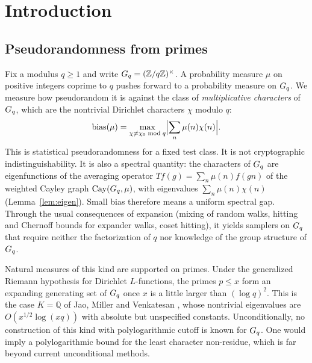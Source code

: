 \section{Introduction}\label{sec:intro}

\subsection{Pseudorandomness from primes}
Fix a modulus $q\ge 1$ and write $G_q=(\mathbb{Z}/q\mathbb{Z})^\times$. A probability measure $\mu$ on positive
integers coprime to $q$ pushes forward to a probability measure on $G_q$. We measure how
pseudorandom it is against the class of \emph{multiplicative characters} of $G_q$, which are the
nontrivial Dirichlet characters $\chi$ modulo $q$:
\[
  \operatorname{bias}(\mu)=\max_{\chi\ne\chi_0 \bmod q}\Bigl\lvert\sum_n \mu(n)\chi(n)\Bigr\rvert .
\]
This is statistical pseudorandomness for a fixed test class. It is not cryptographic
indistinguishability. It is also a spectral quantity: the characters of $G_q$ are eigenfunctions of the
averaging operator $Tf(g)=\sum_n\mu(n)f(gn)$ of the weighted Cayley graph $\mathrm{Cay}(G_q,\mu)$, with
eigenvalues $\sum_n\mu(n)\chi(n)$ (Lemma~\ref{lem:eigen}). Small bias therefore means a uniform
spectral gap. Through the usual consequences of expansion (mixing of random walks, hitting and
Chernoff bounds for expander walks, coset hitting), it yields samplers on $G_q$ that require
neither the factorization of $q$ nor knowledge of the group structure of $G_q$.

Natural measures of this kind are supported on primes. Under the generalized Riemann hypothesis for
Dirichlet $L$-functions, the primes $p\le x$ form an expanding generating set of $G_q$ once $x$ is a
little larger than $(\log q)^2$. This is the case $K=\mathbb{Q}$ of Jao, Miller and Venkatesan
\cite{jmv2009}, whose nontrivial eigenvalues are $O(x^{1/2}\log(xq))$ with absolute but unspecified
constants. Unconditionally, no construction of this kind with polylogarithmic cutoff is known for $G_q$.
One would imply a polylogarithmic bound for the least character non-residue, which is far beyond
current unconditional methods.

